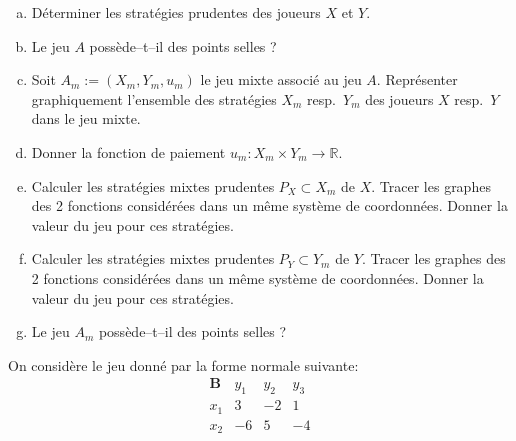 \documentclass[french,11pt,leqno]{article}
\newcounter{exocount}
\newcounter{questcount}
\def\exo{\bigskip\noindent{\bf Exercice \theexocount {} -}
  \addtocounter{exocount}{1} \setcounter{questcount}{1}}
\begin{document}
\begin{enumerate}[a)]%
\item D\'eterminer les strat\'egies prudentes des joueurs $X$ et $Y$.

\item Le jeu $A$ poss\`ede--t--il des points selles ? 
\item Soit $A_m := (X_m, Y_m, u_m)$ le jeu mixte associ\'e au jeu $A$. Repr\'esenter graphiquement l'ensemble des strat\'egies 
       $X_m$ resp.\ $Y_m$ des joueurs $X$ resp.\ $Y$ dans le jeu mixte.
\item Donner la fonction de paiement $u_m : X_m \times Y_m \to \mathbb{R}$.
\item Calculer les strat\'egies mixtes prudentes $P_X \subset X_m$ de $X$. 
       Tracer les graphes des 2 fonctions consid\'er\'ees dans un m\^eme syst\`eme de coordonn\'ees.
       Donner la valeur du jeu pour ces strat\'egies.
\item Calculer les strat\'egies mixtes prudentes $P_Y \subset Y_m$ de $Y$.
        Tracer les graphes des 2 fonctions consid\'er\'ees dans un m\^eme syst\`eme de coordonn\'ees.
       Donner la valeur du jeu pour ces strat\'egies.
\item Le jeu $A_m$ poss\`ede--t--il des points selles ?
\end{enumerate}



\exo 
On consid\`ere le jeu donn\'e par la forme normale suivante:
\begin{equation*}
%
\begin{array}{l|rrr}
 \mathbf{B}   & y_1 & y_2 & y_3  \\ \hline
x_1 & 3& -2 & 1\\
x_2 & -6& 5 & -4\\

\end{array}
%
%
\end{equation*}
\end{document}
